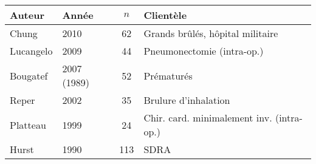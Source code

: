 \begin{table}
	\begin{tabular}{l l c p{5cm}}

\hline
Auteur	&	Année	&	$n$	& Clientèle\\
\hline
	Chung	&	2010	&	62	&	Grands brûlés, hôpital militaire\\
	Lucangelo	&	2009	&	44	&	Pneumonectomie (intra-op.)\\
	Bougatef	&	2007	(1989)	&	52	&	Prématurés\\
	Reper	&	2002	&	35	&	Brulure d'inhalation\\
	Platteau	&	1999	&	24	&	Chir. card. minimalement inv. (intra-op.)\\
		Hurst	&	1990	&	113	&	SDRA\\
\hline

\end{tabular}
\end{table}
